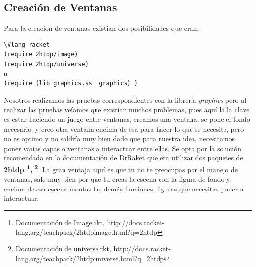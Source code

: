 \documentclass[a4paper]{article} %
\begin{document}
\subsection{Creación de Ventanas}
Para la creacion de ventanas existian dos posibilidades que eran:
\begin{lstlisting}
\#lang racket
(require 2htdp/image) 
(require 2htdp/universe)
o
(require (lib graphics.ss  graphics) )
\end{lstlisting}
Nosotros realizamos las pruebas correspondientes con la librería \textit{graphics} pero al realizar las pruebas veíamos que existían muchos problemas, pues aquí la la clave es estar haciendo un juego entre ventanas, creamos una ventana, se pone el fondo necesario, y creo otra ventana encima de esa para hacer lo que se necesite, pero no es optimo y no saldría muy bien dado que para nuestra idea, necesitamos poner varias capas o ventanas a interactuar entre ellas. Se opto por la solución recomendada en la documentación de DrRaket que era utilizar dos paquetes de \textbf{2htdp \footnote{Documentación de Image.rkt, http://docs.racket-lang.org/teachpack/2htdpimage.html?q=2htdp}, \footnote{Documentación de universe.rkt, http://docs.racket-lang.org/teachpack/2htdpuniverse.html?q=2htdp}}. La gran ventaja aquí es que tu no te preocupas por el manejo de ventanas, sale muy bien por que tu creas la escena con la figura de fondo y encima de esa escena montas las demás funciones, figuras que necesitas poner a interactuar.
\end{document}
